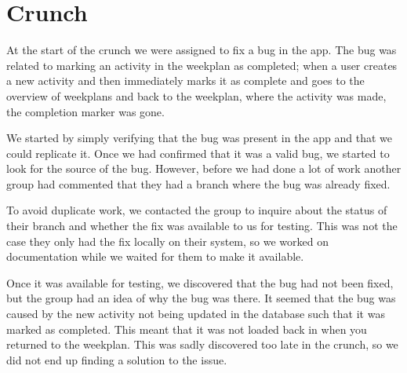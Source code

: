 \section{Crunch}
At the start of the crunch we were assigned to fix a bug in the app.
The bug was related to marking an activity in the weekplan as completed; when a user creates a new activity and then immediately marks it as complete and goes to the overview of weekplans and back to the weekplan, where the activity was made, the completion marker was gone.

We started by simply verifying that the bug was present in the app and that we could replicate it.
Once we had confirmed that it was a valid bug, we started to look for the source of the bug.
However, before we had done a lot of work another group had commented that they had a branch where the bug was already fixed.

To avoid duplicate work, we contacted the group to inquire about the status of their branch and whether the fix was available to us for testing.
This was not the case they only had the fix locally on their system, so we worked on documentation while we waited for them to make it available.

Once it was available for testing, we discovered that the bug had not been fixed, but the group had an idea of why the bug was there.
It seemed that the bug was caused by the new activity not being updated in the database such that it was marked as completed.
This meant that it was not loaded back in when you returned to the weekplan.
This was sadly discovered too late in the crunch, so we did not end up finding a solution to the issue.
